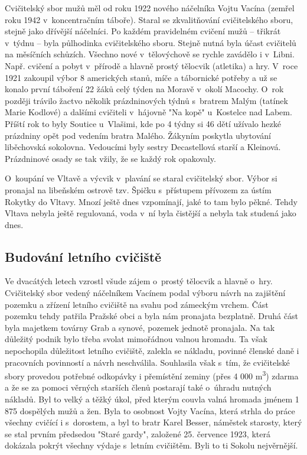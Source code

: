 \documentclass[a5paper, 12pt, twoside]{article}
\begin{document}
Cvičitelský sbor mužů měl od roku 1922 nového náčelníka Vojtu Vacína
(zemřel roku 1942 v~koncentračním táboře). Staral se zkvalitňování
cvičitelského sboru, stejně jako dřívější náčelníci. Po každém
pravidelném cvičení mužů -- třikrát v~týdnu -- byla půlhodinka
cvičitelského sboru. Stejně nutná byla účast cvičitelů na měsíčních
schůzích. Všechno nové v~tělovýchově se rychle zavádělo i v~Libni. Např.
cvičení a pobyt v~přírodě a hlavně prostý tělocvik (atletika) a hry.
V~roce 1921 zakoupil výbor 8 amerických stanů, míče a tábornické potřeby a
už se konalo první táboření 22 žáků celý týden na Moravě v~okolí
Macochy. O~rok později trávilo žactvo několik prázdninových týdnů
s~bratrem Malým (tatínek Marie Kodlové) a dalšími cvičiteli v~hájovně "Na
kopě" u~Kostelce nad Labem. Příští rok to byly Soutice u~Vlašimi, kde
po 4 týdny si 46 dětí užívalo hezké prázdniny opět pod vedením bratra
Malého. Žákyním poskytla ubytování liběchovská sokolovna. Vedoucími byly
sestry Decastellová starší a Kleinová. Prázdninové osady se tak vžily,
že se každý rok opakovaly.

O~koupání ve Vltavě a výcvik v~plavání se staral cvičitelský sbor. Výbor
si pronajal na libeňském ostrově tzv. Špičku s~přístupem přívozem za
ústím Rokytky do Vltavy. Mnozí ještě dnes vzpomínají, jaké to tam bylo
pěkné. Tehdy Vltava nebyla ještě regulovaná, voda v~ní byla čistější a
nebyla tak studená jako dnes.

\subsection{Budování letního
cvičiště}

Ve dvacátých letech vzrostl všude zájem o~prostý tělocvik a hlavně
o~hry. Cvičitelský sbor vedený náčelníkem Vacínem podal výboru návrh na
zajištění pozemku a zřízení letního cvičiště na svahu pod zámeckým
vrchem. Část pozemku tehdy patřila Pražské obci a byla nám pronajata
bezplatně. Druhá část byla majetkem továrny Grab a synové, pozemek
jednotě pronajala. Na tak důležitý podnik bylo třeba svolat mimořádnou
valnou hromadu. Ta však nepochopila důležitost letního cvičiště, zalekla
se nákladu, povinné členské daně i pracovních povinností a návrh
neschválila. Souhlasila však s~tím, že cvičitelské sbory provedou
potřebné odkopávky i přemístění zeminy (přes 4 000 m\textsuperscript{3})
zdarma a že se za pomoci věrných starších členů postarají také o~úhradu
nutných nákladů. Byl to velký a těžký úkol, před kterým couvla valná
hromada jménem 1 875 dospělých mužů a žen. Byla to osobnost Vojty
Vacína, která strhla do práce všechny cvičící i s~dorostem, a byl to
bratr Karel Besser, náměstek starosty, který se stal prvním předsedou
"Staré gardy", založené 25. července 1923, která dokázala pokrýt
všechny výdaje s~letním cvičištěm. Byli to ti Sokolu nejvěrnější.
\end{document}
